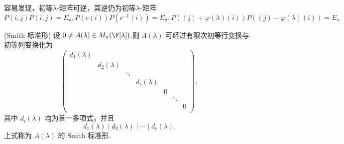 	容易发现，初等$\lambda$-矩阵可逆，其逆仍为初等$\lambda$-矩阵
	\[P(i,j)P(i,j) =E_n,P(c(i))P(c^{-1}(i)) = E_n ,P((j)+\varphi(
	\lambda)(i))P((j)-\varphi(
	\lambda)(i)) = E_n\]
\begin{theorem}(Smith 标准形)
	设 $0\neq A(\lambda)\in M_n(\F[\lambda])$.则 $A(\lambda)$ 可经过有限次初等行变换与初等列变换化为
	\[
	\begin{pmatrix}
		d_1(\lambda) & & & &&& \\
		& d_2(\lambda) & & & &&\\
		& & \ddots & & &&\\
		& & & d_r(\lambda) &&& \\
		& & & & 0&&\\
		&&&&&\ddots&\\
		&&&&&&0\\
	\end{pmatrix},
	\]
	其中 $d_i(\lambda)$ 均为首一多项式，并且
	\[
	d_1(\lambda)\mid d_2(\lambda)\mid\cdots\mid d_r(\lambda).
	\]
	\label{p1:concept:c5-l2095}上式称为 $A(\lambda)$ 的 Smith 标准形.
\end{theorem}

